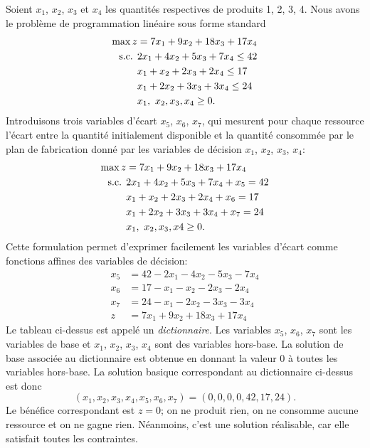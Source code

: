 \begin{example}[Production]
Soient $x_1$, $x_2$, $x_3$ et $x_4$ les quantités respectives de produits 1, 2, 3, 4.
Nous avons le problème de programmation linéaire sous forme standard
\begin{align*}
\max z &= 7x_1 + 9x_2 + 18x_3 + 17x_4 \\
\mbox{s.c. } & 2x_1 + 4x_2 + 5x_3 + 7x_4 \leq 42 \\
& x_1 + x_2 + 2x_3 + 2x_4 \leq 17 \\
& x_1 + 2x_2 + 3x_3 + 3x_4 \leq 24 \\
& x_1,\ x_2, x_3, x_4 \geq 0.
\end{align*}
Introduisons trois variables d'écart $x_5$, $x_6$, $x_7$, qui mesurent pour chaque ressource l'écart entre la quantité initialement disponible et la quantité consommée par le plan de fabrication donné par les variables de décision $x_1$, $x_2$, $x_3$, $x_4$:
\begin{align*}
\max z &= 7x_1 + 9x_2 + 18x_3 + 17x_4 \\
\mbox{s.c. } & 2x_1 + 4x_2 + 5x_3 + 7x_4 + x_5 = 42 \\
& x_1 + x_2 + 2x_3 + 2x_4 + x_6 = 17 \\
& x_1 + 2x_2 + 3x_3 + 3x_4 + x_7 = 24 \\
& x_1,\ x_2, x_3, x4 \geq 0.
\end{align*}
Cette formulation permet d'exprimer facilement les variables d'écart comme fonctions affines des variables de décision:
\begin{align*}
x_5 &= 42 - 2x_1 - 4x_2 - 5x_3 - 7x_4 \\
x_6 &= 17 - x_1 - x_2 - 2x_3 - 2x_4 \\
x_7 &= 24 - x_1 - 2x_2 - 3x_3 - 3x_4 \\
z &= 7x_1 + 9x_2 + 18x_3 + 17x_4
\end{align*}
Le tableau ci-dessus est appelé un {\sl dictionnaire}.
Les variables $x_5$, $x_6$, $x_7$ sont les variables de base et $x_1$, $x_2$, $x_3$, $x_4$ sont des variables hors-base.
La solution de base associée au dictionnaire est obtenue en donnant la valeur 0 à toutes les variables hors-base.
La solution basique correspondant au dictionnaire ci-dessus est donc
\[
(x_1, x_2, x_3, x_4, x_5, x_6, x_7) = (0, 0, 0, 0, 42, 17, 24).
\]
Le bénéfice correspondant est $z = 0$;
on ne produit rien, on ne consomme aucune ressource et on ne gagne rien.
Néanmoins, c'est une solution réalisable, car elle satisfait toutes les contraintes.


\end{example}
